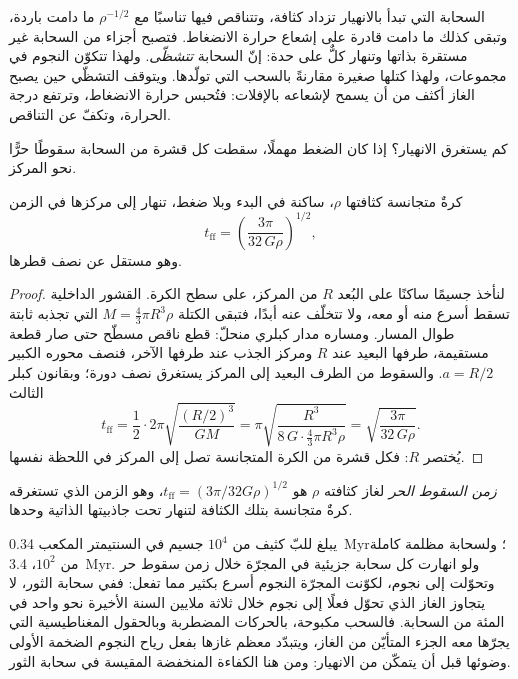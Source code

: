 السحابة التي تبدأ بالانهيار تزداد كثافة، وتتناقص  فيها تناسبًا مع
$\rho^{-1/2}$ ما دامت باردة، وتبقى كذلك ما دامت قادرة على إشعاع
حرارة الانضغاط. فتصبح أجزاء من السحابة غير مستقرة بذاتها
وتنهار كلٌّ على حدة: إنّ السحابة \emph{تتشظّى}. ولهذا تتكوّن النجوم
في مجموعات، ولهذا كتلها صغيرة مقارنةً بالسحب التي تولّدها.
ويتوقف التشظّي حين يصبح الغاز أكثف من أن يسمح لإشعاعه
بالإفلات: فتُحبس حرارة الانضغاط، وترتفع درجة الحرارة، وتكفّ
 عن التناقص.

كم يستغرق الانهيار؟ إذا كان الضغط مهملًا، سقطت كل قشرة من
السحابة سقوطًا حرًّا نحو المركز.

\begin{proposition}\label{prop:b2:ism-star-formation:free-fall}
كرةٌ متجانسة كثافتها $\rho$، ساكنة في البدء وبلا ضغط،
تنهار إلى مركزها في الزمن
\[
  t_{\mathrm{ff}} = \left(\frac{3\pi}{32\,G\rho}\right)^{1/2},
\]
وهو مستقل عن نصف قطرها.
\end{proposition}

\begin{proof}
لنأخذ جسيمًا ساكنًا على البُعد $R$ من المركز، على
سطح الكرة. القشور الداخلية تسقط أسرع منه أو معه، ولا تتخلّف
عنه أبدًا، فتبقى الكتلة $M = \tfrac43\pi R^3\rho$ التي تجذبه ثابتة
طوال المسار. ومساره مدار كبلري منحلّ: قطع ناقص مسطّح حتى صار
قطعة مستقيمة، طرفها البعيد عند $R$ ومركز الجذب عند
طرفها الآخر، فنصف محوره الكبير $a = R/2$. والسقوط من الطرف البعيد
إلى المركز يستغرق نصف دورة؛ وبقانون كبلر الثالث
\[
  t_{\mathrm{ff}} = \frac12\cdot 2\pi\sqrt{\frac{(R/2)^3}{GM}}
  = \pi\sqrt{\frac{R^3}{8\,G\cdot\frac43\pi R^3\rho}}
  = \sqrt{\frac{3\pi}{32\,G\rho}} .
\]
يُختصر $R$: فكل قشرة من الكرة المتجانسة تصل إلى المركز في
اللحظة نفسها.
\end{proof}

\begin{definition}\label{def:b2:ism-star-formation:free-fall}
\emph{زمن السقوط الحر} لغاز كثافته $\rho$ هو
$t_{\mathrm{ff}} = (3\pi/32G\rho)^{1/2}$، وهو الزمن الذي تستغرقه كرةٌ متجانسة بتلك
الكثافة لتنهار تحت جاذبيتها الذاتية وحدها.
\end{definition}

يبلغ  للبّ كثيف من $10^4$ جسيم في السنتيمتر المكعب
\qty{0.34}{Myr}؛ ولسحابة مظلمة كاملة من $10^2$، \qty{3.4}{Myr}. ولو انهارت كل
سحابة جزيئية في المجرّة خلال زمن سقوط حر وتحوّلت إلى
نجوم، لكوّنت المجرّة النجوم أسرع بكثير مما تفعل: ففي سحابة الثور، لا يتجاوز الغاز الذي تحوّل فعلًا
إلى نجوم خلال ثلاثة ملايين السنة الأخيرة نحو واحد في المئة من السحابة.
فالسحب مكبوحة، بالحركات المضطربة وبالحقول المغناطيسية التي يجرّها معه
الجزء المتأيّن من الغاز، ويتبدّد معظم غازها بفعل
رياح النجوم الضخمة الأولى وضوئها قبل أن يتمكّن من الانهيار: ومن هنا
الكفاءة المنخفضة المقيسة في سحابة الثور.

